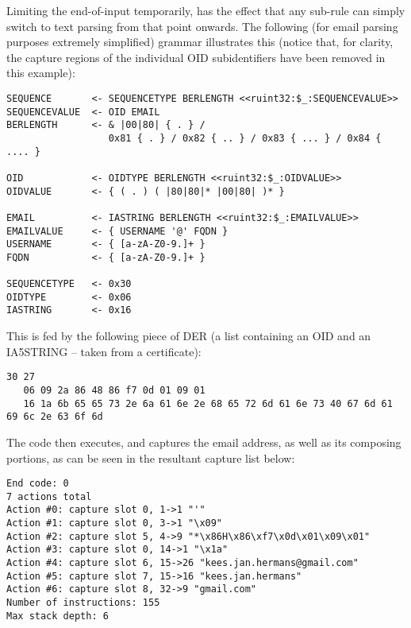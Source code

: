 Limiting the end-of-input temporarily, has the effect that any sub-rule 
can simply switch to text parsing from that point onwards. The following 
(for email parsing purposes extremely simplified) grammar illustrates this
(notice that, for clarity, the capture regions of the individual OID
subidentifiers have been removed in this example):

\begin{changemargin}{-60mm}{0mm}
\begin{myquote}
\begin{verbatim}
SEQUENCE       <- SEQUENCETYPE BERLENGTH <<ruint32:$_:SEQUENCEVALUE>>
SEQUENCEVALUE  <- OID EMAIL
BERLENGTH      <- & |00|80| { . } /
                  0x81 { . } / 0x82 { .. } / 0x83 { ... } / 0x84 { .... }

OID            <- OIDTYPE BERLENGTH <<ruint32:$_:OIDVALUE>>
OIDVALUE       <- { ( . ) ( |80|80|* |00|80| )* }

EMAIL          <- IASTRING BERLENGTH <<ruint32:$_:EMAILVALUE>>
EMAILVALUE     <- { USERNAME '@' FQDN }
USERNAME       <- { [a-zA-Z0-9.]+ }
FQDN           <- { [a-zA-Z0-9.]+ }

SEQUENCETYPE   <- 0x30
OIDTYPE        <- 0x06
IASTRING       <- 0x16
\end{verbatim}
\end{myquote}
\end{changemargin}

This is fed by the following piece of DER (a list containing an OID and an 
IA5STRING – taken from a certificate):

\begin{changemargin}{-60mm}{0mm}
\begin{myquote}
\begin{verbatim}
30 27
   06 09 2a 86 48 86 f7 0d 01 09 01
   16 1a 6b 65 65 73 2e 6a 61 6e 2e 68 65 72 6d 61 6e 73 40 67 6d 61 69 6c 2e 63 6f 6d
\end{verbatim}
\end{myquote}
\end{changemargin}

The code then executes, and captures the email address, as well as its 
composing portions, as can be seen in the resultant capture list below:

\begin{changemargin}{-60mm}{0mm}
\begin{myquote}
\begin{verbatim}
End code: 0
7 actions total
Action #0: capture slot 0, 1->1 "'"
Action #1: capture slot 0, 3->1 "\x09"
Action #2: capture slot 5, 4->9 "*\x86H\x86\xf7\x0d\x01\x09\x01"
Action #3: capture slot 0, 14->1 "\x1a"
Action #4: capture slot 6, 15->26 "kees.jan.hermans@gmail.com"
Action #5: capture slot 7, 15->16 "kees.jan.hermans"
Action #6: capture slot 8, 32->9 "gmail.com"
Number of instructions: 155
Max stack depth: 6
\end{verbatim}
\end{myquote}
\end{changemargin}

